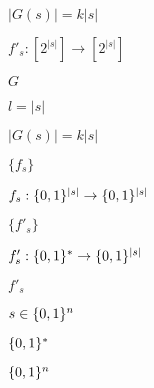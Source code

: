 \documentclass[10pt]{book}
\begin{document}
\begin{mdSnippets}
\begin{mdInlineSnippet}[8743041d51b9cf34b1fb0a82cea6d445]
$|G(s)| = k|s|$\end{mdInlineSnippet}%
\begin{mdInlineSnippet}[607aa8747f41ed8fb0fb4a366df35aa2]%
$f'_s: [2^{|s|}] \to [2^{|s|}]$\end{mdInlineSnippet}%
\begin{mdInlineSnippet}[dfcf28d0734569a6a693bc8194de62bf]%
$G$\end{mdInlineSnippet}%
\begin{mdInlineSnippet}%
$l = |s|$\end{mdInlineSnippet}%
\begin{mdInlineSnippet}[8743041d51b9cf34b1fb0a82cea6d445]%
$|G(s)| = k|s|$\end{mdInlineSnippet}%
\begin{mdInlineSnippet}[37a2ce8e5337ae1139e64a8ff1f2f6bb]%
$\{ f_s \}$\end{mdInlineSnippet}%
\begin{mdInlineSnippet}%
$f_s:\{0,1\}^{|s|}\rightarrow\{0,1\}^{|s|}$\end{mdInlineSnippet}%
\begin{mdInlineSnippet}[d2a9c8322690fce87499dd560ac2f432]%
$\{ f'_s \}$\end{mdInlineSnippet}%
\begin{mdInlineSnippet}[80138248d5a00cc057e00756a674d833]%
$f'_s:\{0,1\}^{*}\rightarrow\{0,1\}^{|s|}$\end{mdInlineSnippet}%
\begin{mdInlineSnippet}%
$f'_s$\end{mdInlineSnippet}%
\begin{mdInlineSnippet}[43bee3665f89f73af01ef178208a8224]%
$s\in\{0,1\}^n$\end{mdInlineSnippet}%
\begin{mdInlineSnippet}%
$\{0,1\}^*$\end{mdInlineSnippet}%
\begin{mdInlineSnippet}[5867c9b098884eca2779f6d98d4b0b29]%
$\{0,1\}^n$\end{mdInlineSnippet}%
\begin{mdInlineSnippet}[d2a9c8322690fce87499dd560ac2f432]%

\end{mdInlineSnippet}
\end{mdSnippets}
\end{document}
